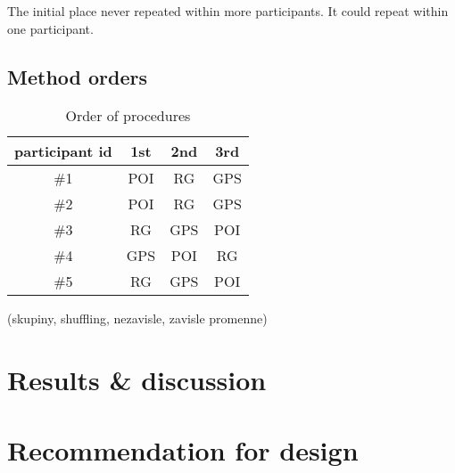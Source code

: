 	The initial place never repeated within more participants. It could repeat within one participant.
	\subsection{Method orders}
	\begin{table}[]
		\centering
		\caption{Order of procedures}
		\label{my-label}
		\begin{tabular}{@{}cccc@{}}
			\toprule
			\textbf{participant id} & \textbf{1st} & \textbf{2nd} & \textbf{3rd} \\ \midrule
			\#1                     & POI          & RG           & GPS          \\
			\#2                     & POI          & RG           & GPS          \\
			\#3                     & RG           & GPS          & POI          \\
			\#4                     & GPS          & POI          & RG           \\
			\#5                     & RG           & GPS          & POI          \\ \bottomrule
		\end{tabular}
	\end{table}
	
	(skupiny, shuffling, nezavisle, zavisle promenne)
	\section{Results \& discussion}
	\section{Recommendation for design}